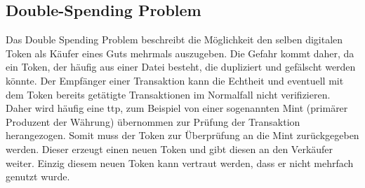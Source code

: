 \subsection{Double-Spending Problem}
\label{sec:sota_doublespend}
	Das Double Spending Problem beschreibt die Möglichkeit den selben digitalen Token als Käufer eines Guts mehrmals auszugeben\cite{Chohan2017}.
	Die Gefahr kommt daher, da ein Token, der häufig aus einer Datei besteht, die dupliziert und gefälscht werden könnte\cite{Chohan2017}.
	Der Empfänger einer Transaktion kann die Echtheit und eventuell mit dem Token bereits getätigte Transaktionen im Normalfall nicht verifizieren\cite{Nakamoto2008}.
	Daher wird häufig eine \gls{ttp}, zum Beispiel von einer sogenannten Mint (primärer Produzent der Währung) übernommen zur Prüfung der Transaktion herangezogen\cite{Nakamoto2008}.
	Somit muss der Token zur Überprüfung an die Mint zurückgegeben werden. 
	Dieser erzeugt einen neuen Token und gibt diesen an den Verkäufer weiter.
	Einzig diesem neuen Token kann vertraut werden, dass er nicht mehrfach genutzt wurde\cite{Nakamoto2008}.